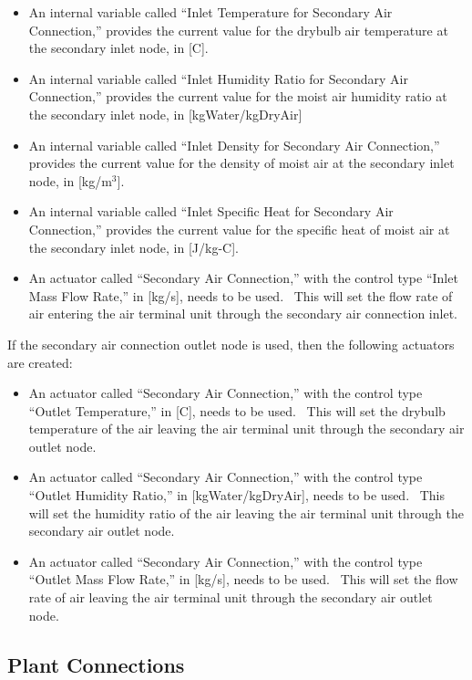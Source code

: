 \begin{itemize}
\item
  An internal variable called ``Inlet Temperature for Secondary Air Connection,'' provides the current value for the drybulb air temperature at the secondary inlet node, in {[}C{]}.
\item
  An internal variable called ``Inlet Humidity Ratio for Secondary Air Connection,'' provides the current value for the moist air humidity ratio at the secondary inlet node, in {[}kgWater/kgDryAir{]}
\item
  An internal variable called ``Inlet Density for Secondary Air Connection,'' provides the current value for the density of moist air at the secondary inlet node, in {[}kg/m\(^{3}\){]}.
\item
  An internal variable called ``Inlet Specific Heat for Secondary Air Connection,'' provides the current value for the specific heat of moist air at the secondary inlet node, in {[}J/kg-C{]}.
\item
  An actuator called ``Secondary Air Connection,'' with the control type ``Inlet Mass Flow Rate,'' in {[}kg/s{]}, needs to be used.~ This will set the flow rate of air entering the air terminal unit through the secondary air connection inlet.
\end{itemize}

If the secondary air connection outlet node is used, then the following actuators are created:

\begin{itemize}
\item
  An actuator called ``Secondary Air Connection,'' with the control type ``Outlet Temperature,'' in {[}C{]}, needs to be used.~ This will set the drybulb temperature of the air leaving the air terminal unit through the secondary air outlet node.
\item
  An actuator called ``Secondary Air Connection,'' with the control type ``Outlet Humidity Ratio,'' in {[}kgWater/kgDryAir{]}, needs to be used.~ This will set the humidity ratio of the air leaving the air terminal unit through the secondary air outlet node.
\item
  An actuator called ``Secondary Air Connection,'' with the control type ``Outlet Mass Flow Rate,'' in {[}kg/s{]}, needs to be used.~ This will set the flow rate of air leaving the air terminal unit through the secondary air outlet node.
\end{itemize}

\subsection{Plant Connections}\label{plant-connections-000}

